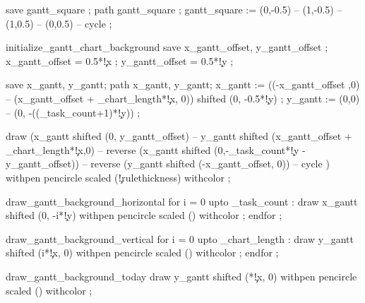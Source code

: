      save gantt_square ; path gantt_square ;
     gantt_square := (0,-0.5) -- (1,-0.5) -- (1,0.5) -- (0,0.5) -- cycle ;
   \stopMPdrawing
\stoptexdefinition

\starttexdefinition initialize_gantt_chart_background
  \startMPdrawing
      save x_gantt_offset, y_gantt_offset ;
      x_gantt_offset = 0.5*\ganttchartparameter\c!x ;
      y_gantt_offset = 0.5*\ganttchartparameter\c!y ;

      save x_gantt, y_gantt;
      path x_gantt, y_gantt;
      x_gantt := ((-x_gantt_offset ,0) -- (x_gantt_offset + \the\gantt_chart_length*\ganttchartparameter\c!x, 0)) 
                 shifted (0, -0.5*\ganttchartparameter\c!y) ;
      y_gantt := (0,0) -- (0, -((\gantt_task_count+1)*\ganttchartparameter\c!y)) ;

      draw (x_gantt shifted (0, y_gantt_offset) --
            y_gantt shifted (x_gantt_offset + \the\gantt_chart_length*\ganttchartparameter\c!x,0) --
            reverse (x_gantt shifted (0,-\gantt_task_count*\ganttchartparameter\c!y - y_gantt_offset)) --
            reverse (y_gantt shifted (-x_gantt_offset, 0)) -- cycle )
           withpen pencircle scaled (\ganttchartparameter\c!rulethickness) %
           withcolor  ;
 \stopMPdrawing
\stoptexdefinition

\starttexdefinition draw_gantt_background_horizontal
  \startMPdrawing
      for i = 0 upto \gantt_task_count :
          draw x_gantt shifted (0, -i*\ganttchartparameter\c!y) %
           withpen pencircle scaled () %
           withcolor  ;
      endfor ;
  \stopMPdrawing
\stoptexdefinition

\starttexdefinition draw_gantt_background_vertical
  \startMPdrawing
      for i = 0 upto \the\gantt_chart_length  :
          draw y_gantt shifted (i*\ganttchartparameter\c!x, 0) %
           withpen pencircle scaled () %
           withcolor  ;
      endfor ;
  \stopMPdrawing
\stoptexdefinition

\starttexdefinition draw_gantt_background_today
  \startMPdrawing
      draw y_gantt shifted (*\ganttchartparameter\c!x, 0) %
           withpen pencircle scaled () %
           withcolor  ;
  \stopMPdrawing
\stoptexdefinition

